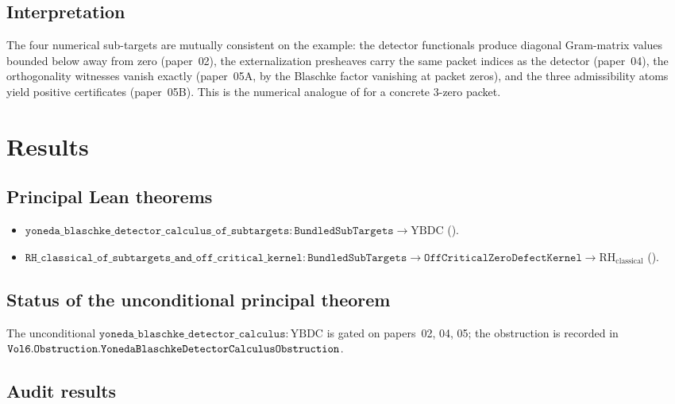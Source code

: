 \documentclass[12pt]{article}
\theoremstyle{plain}
\theoremstyle{definition}
\theoremstyle{remark}
\newcommand{\YBDC}{\mathrm{YBDC}}
\begin{document}
\subsection{Interpretation}

The four numerical sub-targets are mutually consistent on the example:
the detector functionals produce diagonal Gram-matrix values bounded
below away from zero (paper~02), the externalization presheaves carry
the same packet indices as the detector (paper~04), the
orthogonality witnesses vanish exactly (paper~05A, by the Blaschke
factor vanishing at packet zeros), and the three admissibility atoms
yield positive certificates (paper~05B). This is the numerical analogue
of  for a concrete 3-zero packet.

\section{Results}
\label{sec:results}

\subsection{Principal Lean theorems}

\begin{itemize}
  \item \(\mathtt{yoneda\_blaschke\_detector\_calculus\_of\_subtargets}
        : \mathtt{BundledSubTargets} \to \YBDC\)
        ().
  \item \(\mathtt{RH\_classical\_of\_subtargets\_and\_off\_critical\_kernel}
        : \mathtt{BundledSubTargets} \to \mathtt{OffCriticalZeroDefectKernel}
        \to \mathrm{RH}_{\mathrm{classical}}\)
        ().
\end{itemize}

\subsection{Status of the unconditional principal theorem}

The unconditional
\(\mathtt{yoneda\_blaschke\_detector\_calculus} : \YBDC\) is gated on
papers~02, 04, 05; the obstruction is recorded in
\(\mathtt{Vol6.Obstruction.Yoneda\-Blaschke\-Detector\-Calculus\-%
Obstruction}\).

\subsection{Audit results}
\end{document}
